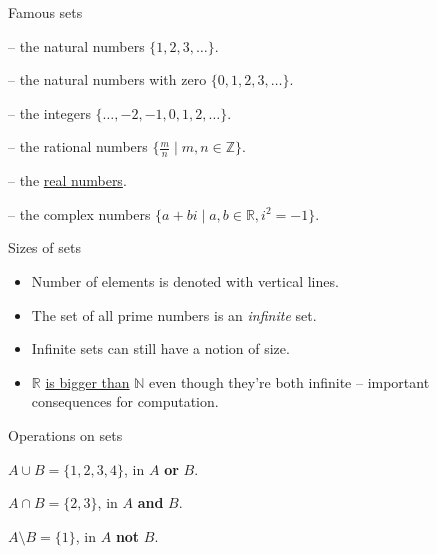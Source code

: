 \begin{frame}[fragile]{Famous sets}
  \begin{description}[123]
    \setlength\itemsep{5mm}
    \item[$\mathbb{N}$] -- the natural numbers $\{ 1, 2, 3, \ldots \}$.
    \item[$\mathbb{N}_0$] -- the natural numbers with zero $\{ 0, 1, 2, 3, \ldots \}$.
    \item[$\mathbb{Z}$] -- the integers $\{ \ldots, -2, -1, 0, 1, 2, \ldots \}$.
    \item[$\mathbb{Q}$] -- the rational numbers $\{ \frac{m}{n} \mid m, n \in \mathbb{Z} \}$.
    \item[$\mathbb{R}$] -- the \href{https://en.wikipedia.org/wiki/Real\_number\#Definition}{real numbers}.
    \item[$\mathbb{C}$] -- the complex numbers $\{ a + bi \mid a, b \in \mathbb{R}, i^2 = -1 \}$.
  \end{description}
\end{frame}


\begin{frame}[fragile]{Sizes of sets}
  

  \begin{itemize}
    \setlength\itemsep{4mm}
    \item Number of elements is denoted with vertical lines.
    \item The set of all prime numbers is an \emph{infinite} set.
    \item Infinite sets can still have a notion of size.
    \item $\mathbb{R}$ \href{https://en.wikipedia.org/wiki/Cantor\%27s\_diagonal\_argument}{is bigger than} $\mathbb{N}$ even though they're both infinite -- important consequences for computation.
  \end{itemize}
\end{frame}


\begin{frame}{Operations on sets}
  \vspace{4mm}
  \begin{description}[Intersection:]
    \setlength\itemsep{6mm}
    \item[Union:] $A \cup B = \{1,2,3,4\}$, in $A$ \textbf{or} $B$.
    \item[Intersection:] $A \cap B = \{2,3\}$, in $A$ \textbf{and} $B$.
    \item[Difference:] $A \setminus B = \{1\}$, in $A$ \textbf{not} $B$.
  \end{description}
\end{frame}






